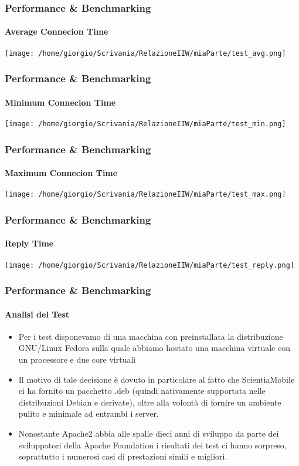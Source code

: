 \documentclass{beamer}
\begin{document}
\begin{frame}
\frametitle{Performance \& Benchmarking}
\framesubtitle{Average Connecion Time}
\begin{center}


\texttt{[image: /home/giorgio/Scrivania/RelazioneIIW/miaParte/test\_avg.png]}
\end{center}
\end{frame}



\begin{frame}
\frametitle{Performance \& Benchmarking}
\framesubtitle{Minimum Connecion Time}
\begin{center}


\texttt{[image: /home/giorgio/Scrivania/RelazioneIIW/miaParte/test\_min.png]}
\end{center}
\end{frame}




\begin{frame}
\frametitle{Performance \& Benchmarking}
\framesubtitle{Maximum Connecion Time}
\begin{center}


\texttt{[image: /home/giorgio/Scrivania/RelazioneIIW/miaParte/test\_max.png]}
\end{center}
\end{frame}




\begin{frame}
\frametitle{Performance \& Benchmarking}
\framesubtitle{Reply Time}
\begin{center}


\texttt{[image: /home/giorgio/Scrivania/RelazioneIIW/miaParte/test\_reply.png]}
\end{center}
\end{frame}






\begin{frame}
\frametitle{Performance \& Benchmarking}
\framesubtitle{Analisi del Test}

\begin{itemize}
\item Per i test disponevamo di una macchina con preinstallata la distribuzione
GNU/Linux Fedora sulla quale abbiamo hostato una macchina virtuale con un
processore e due core virtuali
\item Il motivo di tale decisione è dovuto in particolare
al fatto che ScientiaMobile ci ha fornito un pacchetto .deb (quindi nativamente
supportata nelle distribuzioni Debian e derivate), oltre alla volontà di fornire un
ambiente pulito e minimale ad entrambi i server.
\item Nonostante Apache2 abbia alle spalle dieci anni di sviluppo da parte dei
sviluppatori della Apache Foundation i risultati dei test ci hanno sorpreso,
soprattutto i numerosi casi di prestazioni simili e migliori.
\end{itemize}
\end{frame}
\end{document}
